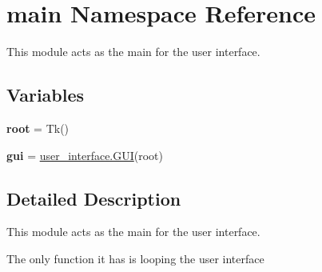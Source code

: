 \hypertarget{namespacemain}{}\section{main Namespace Reference}
\label{namespacemain}


This module acts as the main for the user interface.  


\subsection*{Variables}
\begin{DoxyCompactItemize}
\item 
\mbox{\label{namespacemain_aa698d1260ba54f169d55a5630f0f0aa3}} 
{\bfseries root} = Tk()
\item 
\mbox{\label{namespacemain_a361ebd575072b82410aaa1adc5024a76}} 
{\bfseries gui} = \hyperlink{classuser__interface_1_1GUI}{user\+\_\+interface.\+G\+UI}(root)
\end{DoxyCompactItemize}


\subsection{Detailed Description}
This module acts as the main for the user interface. 

The only function it has is looping the user interface 